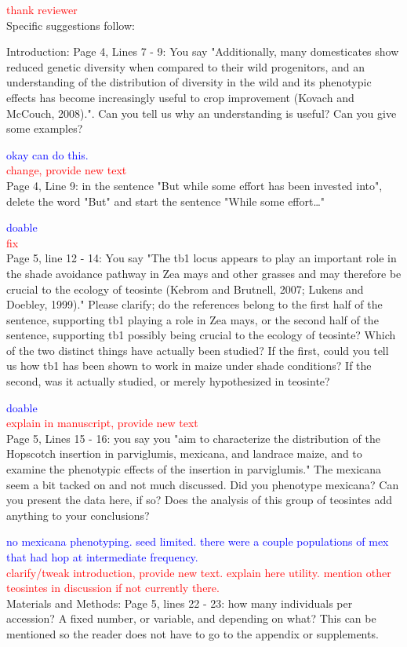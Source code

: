\documentclass[11pt]{article}
\newcommand{\res}[1]{\noindent \textcolor{blue}{{#1}} \\}
\newcommand{\jri}[1]{\noindent \textcolor{red}{{#1}} \\}
\begin{document}
\jri{thank reviewer}

Specific suggestions follow:

Introduction:
Page 4, Lines 7 - 9: You say "Additionally, many domesticates show reduced genetic diversity when compared to their wild progenitors, and an understanding of the distribution of diversity in the wild and its phenotypic eﬀects has become increasingly useful to crop improvement (Kovach and McCouch, 2008).".  Can you tell us why an understanding is useful? Can you give some examples? 

\res{okay can do this.}
\jri{change, provide new text}

Page 4, Line 9: in the sentence "But while some eﬀort has been invested into", delete the word "But" and start the sentence "While some effort…" 

\res{doable}
\jri{fix}

Page 5, line 12 - 14: You say "The tb1 locus appears to play an important role in the shade avoidance pathway in Zea mays and other grasses and may therefore be crucial to the ecology of teosinte (Kebrom and Brutnell, 2007; Lukens and Doebley, 1999)." Please clarify; do the references belong to the first half of the sentence, supporting tb1 playing a role in Zea mays, or the second half of the sentence, supporting tb1 possibly being crucial to the ecology of teosinte? Which of the two distinct things have actually been studied? If the first, could you tell us how tb1 has been shown to work in maize under shade conditions? If the second, was it actually studied, or merely hypothesized in teosinte? 

\res{doable}
\jri{explain in manuscript, provide new text}

Page 5, Lines 15 - 16: you say you "aim to characterize the distribution of the Hopscotch insertion in parviglumis, mexicana, and landrace maize, and to examine the phenotypic eﬀects of the insertion in parviglumis."  The mexicana seem a bit tacked on and not much discussed. Did you phenotype mexicana? Can you present the data here, if so? Does the analysis of this group of teosintes add anything to your conclusions? 

\res{no mexicana phenotyping. seed limited. there were a couple populations of mex that had hop at intermediate frequency.}
\jri{clarify/tweak introduction, provide new text. explain here utility. mention other teosintes in discussion if not currently there.}

Materials and Methods:
Page 5, lines 22 - 23: how many individuals per accession? A fixed number, or variable, and depending on what? This can be mentioned so the reader does not have to go to the appendix or supplements. 
\end{document}
